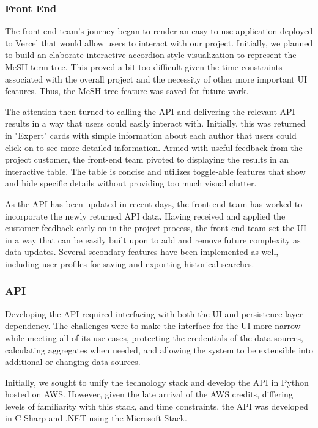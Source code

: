 \subsubsection{Front End}

The front-end team's journey began to render an easy-to-use application deployed to Vercel that would allow users to interact with our project. Initially, we planned to build an elaborate interactive accordion-style visualization to represent the MeSH term tree. This proved a bit too difficult given the time constraints associated with the overall project and the necessity of other more important UI features. Thus, the MeSH tree feature was saved for future work. 

The attention then turned to calling the API and delivering the relevant API results in a way that users could easily interact with. Initially, this was returned in "Expert" cards with simple information about each author that users could click on to see more detailed information. Armed with useful feedback from the project customer, the front-end team pivoted to displaying the results in an interactive table. The table is concise and utilizes toggle-able features that show and hide specific details without providing too much visual clutter. 

As the API has been updated in recent days, the front-end team has worked to incorporate the newly returned API data. Having received and applied the customer feedback early on in the project process, the front-end team set the UI in a way that can be easily built upon to add and remove future complexity as data updates. Several secondary features have been implemented as well, including user profiles for saving and exporting historical searches. 

\subsubsection{API}

Developing the API required interfacing with both the UI and persistence layer dependency. The challenges were to make the interface for the UI more narrow while meeting all of its use cases, protecting the credentials of the data sources, calculating aggregates when needed, and allowing the system to be extensible into additional or changing data sources.

Initially, we sought to unify the technology stack and develop the API in Python hosted on AWS. However, given the late arrival of the AWS credits, differing levels of familiarity with this stack, and time constraints, the API was developed in C-Sharp and .NET using the Microsoft Stack.

